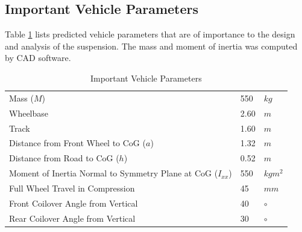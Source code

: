 \documentclass[12pt]{article}
\begin{document}
\subsection{Important Vehicle Parameters}
Table \ref{tab:params} lists predicted vehicle parameters that are of importance to the design and analysis of the suspension. The mass and moment of inertia was computed by CAD software. 
\begin{table}[htbp]
	\centering
	\caption{Important Vehicle Parameters}
	\label{tab:params}
	\begin{tabular}{lll}
	Mass ($M$)                            	& 550  & $kg$       \\
	Wheelbase                       	 	& 2.60  & $m$  		\\
	Track                       	 		& 1.60  & $m$  		\\
	Distance from Front Wheel to CoG ($a$)	& 1.32 & $m$  		\\
	Distance from Road to CoG ($h$)		& 0.52 & $m$  		\\
	Moment of Inertia Normal to Symmetry Plane at CoG ($I_{xx}$) & 550  & $kgm^2$ \\
	Full Wheel Travel in Compression 	& 45   & $mm$ 		\\
	Front Coilover Angle from Vertical	& 40   & $\circ$ 	\\
	Rear Coilover Angle from Vertical	& 30   & $\circ$
	\end{tabular}
\end{table}
\end{document}
